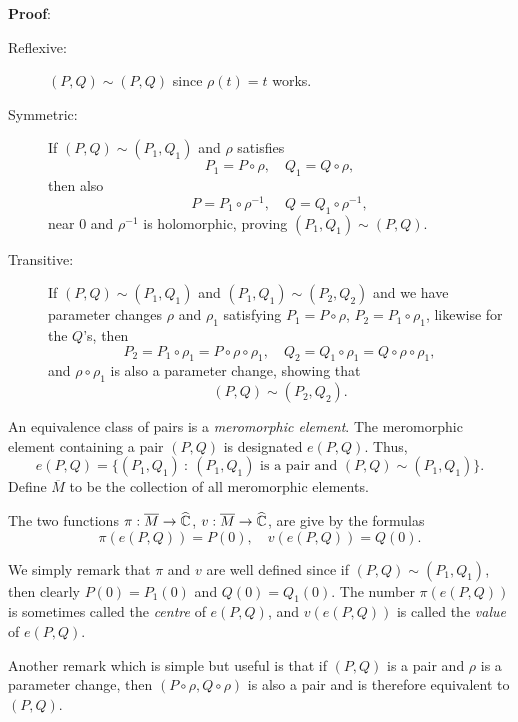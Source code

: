 \documentclass[a4paper,11pt]{article}
\begin{document}
\begin{mdframed}
  \textbf{Proof}:
  \begin{description}
  \item[Reflexive:] $(P,Q) \sim (P,Q)$ since $\rho(t) = t$ works.
  \item[Symmetric:] If $(P,Q) \sim (P_1,Q_1)$ and $\rho$ satisfies
    $$
    P_1 = P \circ \rho,\quad Q_1 = Q \circ \rho,
    $$
    then also
    $$
    P = P_1 \circ \rho^{-1},\quad Q = Q_1 \circ \rho^{-1},
    $$
    near 0 and $\rho^{-1}$ is holomorphic, proving $(P_1,Q_1) \sim
    (P,Q)$.
  \item[Transitive:] If $(P,Q) \sim (P_1,Q_1)$ and $(P_1,Q_1) \sim
    (P_2,Q_2)$ and we have parameter changes $\rho$ and $\rho_1$
    satisfying $P_1 = P\circ \rho$, $P_2 = P_1 \circ \rho_1$, likewise
    for the $Q$'s, then
    $$
    P_2 = P_1 \circ \rho_1 = P\circ \rho \circ \rho_1,\quad
    Q_2 = Q_1 \circ \rho_1 = Q\circ \rho \circ \rho_1,
    $$
    and $\rho\circ \rho_1$ is also a parameter change, showing that
    $$
    (P,Q) \sim (P_2,Q_2).
    $$
  \end{description}
\end{mdframed}

\begin{defn}
  \label{def:4}
  An equivalence class of pairs is a \emph{meromorphic element}.  The
  meromorphic element containing a pair $(P,Q)$ is designated
  $e(P,Q)$.  Thus,
  $$
  e(P,Q) = \{(P_1,Q_1) ~:~ (P_1,Q_1)\text{ is a pair and }(P,Q) \sim
  (P_1, Q_1)\}.
  $$
  Define $\overline{M}$ to be the collection of all meromorphic
  elements.
\end{defn}

\begin{defn}
  \label{def:5}
  The two functions $\pi : \overline{M} \to \widehat{{\mathbb C}}$, $v :
  \overline{M} \to \widehat{{\mathbb C}}$, are give by the formulas
  $$
  \pi(e(P,Q)) = P(0),\quad
  v(e(P,Q)) = Q(0).
  $$
\end{defn}
We simply remark that $\pi$ and $v$ are well defined since if $(P,Q)
\sim (P_1,Q_1)$, then clearly $P(0) = P_1(0)$ and $Q(0) = Q_1(0)$.
The number $\pi(e(P,Q))$ is sometimes called the \emph{centre} of
$e(P,Q)$, and $v(e(P,Q))$ is called the \emph{value} of $e(P,Q)$.

Another remark which is simple but useful is that if $(P,Q)$ is a pair
and $\rho$ is a parameter change, then $(P\circ \rho, Q\circ \rho)$ is
also a pair and is therefore equivalent to $(P,Q)$.
\end{document}
